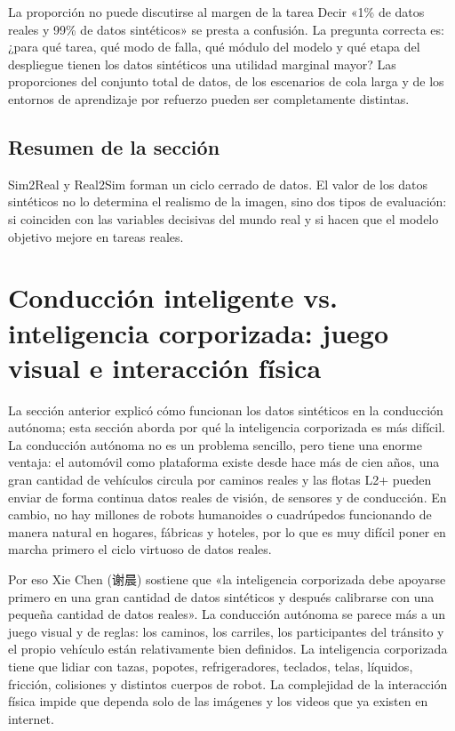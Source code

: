 \documentclass[a4paper]{article}
\begin{document}
\begin{warningbox}{La proporción no puede discutirse al margen de la tarea}
Decir «1\% de datos reales y 99\% de datos sintéticos» se presta a confusión. La pregunta correcta es: ¿para qué tarea, qué modo de falla, qué módulo del modelo y qué etapa del despliegue tienen los datos sintéticos una utilidad marginal mayor? Las proporciones del conjunto total de datos, de los escenarios de cola larga y de los entornos de aprendizaje por refuerzo pueden ser completamente distintas.
\end{warningbox}

\subsection{Resumen de la sección}

Sim2Real y Real2Sim forman un ciclo cerrado de datos. El valor de los datos sintéticos no lo determina el realismo de la imagen, sino dos tipos de evaluación: si coinciden con las variables decisivas del mundo real y si hacen que el modelo objetivo mejore en tareas reales.
\section{Conducción inteligente vs. inteligencia corporizada: juego visual e interacción física}

La sección anterior explicó cómo funcionan los datos sintéticos en la conducción autónoma; esta sección aborda por qué la inteligencia corporizada es más difícil. La conducción autónoma no es un problema sencillo, pero tiene una enorme ventaja: el automóvil como plataforma existe desde hace más de cien años, una gran cantidad de vehículos circula por caminos reales y las flotas L2+ pueden enviar de forma continua datos reales de visión, de sensores y de conducción. En cambio, no hay millones de robots humanoides o cuadrúpedos funcionando de manera natural en hogares, fábricas y hoteles, por lo que es muy difícil poner en marcha primero el ciclo virtuoso de datos reales.

Por eso Xie Chen (谢晨) sostiene que «la inteligencia corporizada debe apoyarse primero en una gran cantidad de datos sintéticos y después calibrarse con una pequeña cantidad de datos reales». La conducción autónoma se parece más a un juego visual y de reglas: los caminos, los carriles, los participantes del tránsito y el propio vehículo están relativamente bien definidos. La inteligencia corporizada tiene que lidiar con tazas, popotes, refrigeradores, teclados, telas, líquidos, fricción, colisiones y distintos cuerpos de robot. La complejidad de la interacción física impide que dependa solo de las imágenes y los videos que ya existen en internet.
\end{document}
